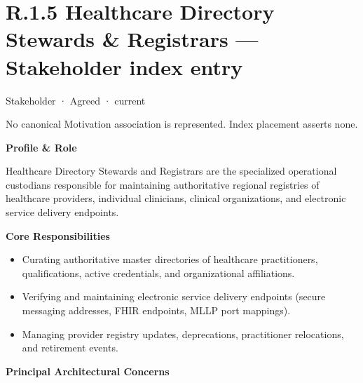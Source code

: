 \section*{R.1.5 Healthcare Directory Stewards \& Registrars — Stakeholder index entry}
\label{navigation:R.1.5}

\label{element:1c8e2c898a28436693cf2ae69776e125}
{\small Stakeholder · Agreed · current}\par
No canonical Motivation association is represented. Index placement asserts none.\par

\par\medskip\textbf{Profile \& Role}\par


Healthcare Directory Stewards and Registrars are the specialized operational custodians responsible for maintaining authoritative regional registries of healthcare providers, individual clinicians, clinical organizations, and electronic service delivery endpoints.



\par\medskip\textbf{Core Responsibilities}\par


\begin{itemize}


\item Curating authoritative master directories of healthcare practitioners, qualifications, active credentials, and organizational affiliations.

\item Verifying and maintaining electronic service delivery endpoints (secure messaging addresses, FHIR endpoints, MLLP port mappings).

\item Managing provider registry updates, deprecations, practitioner relocations, and retirement events.

\end{itemize}


\par\medskip\textbf{Principal Architectural Concerns}\par


